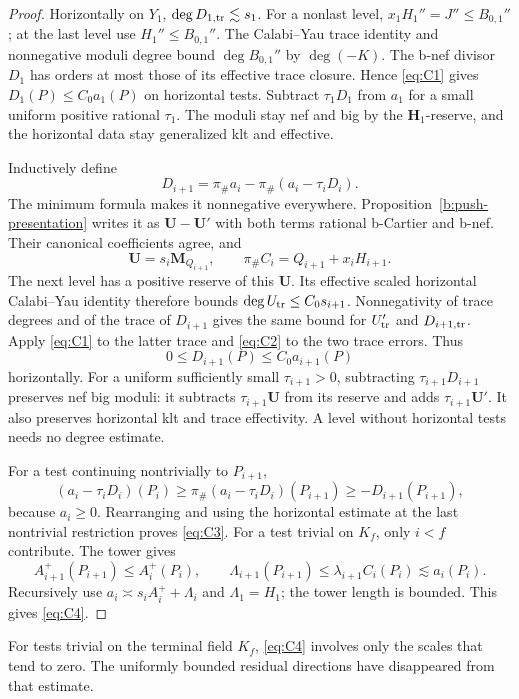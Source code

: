 \begin{proof}
Horizontally on \(Y_1\), \(\deg D_{1,\rm tr}\lesssim s_1\).
For a nonlast level, \(x_1H_1''=J''\le B_{0,1}''\);
at the last level use \(H_1''\le B_{0,1}''\).
The Calabi--Yau trace identity and nonnegative moduli degree bound
\(\deg B_{0,1}''\) by \(\deg(-K)\).
The b-nef divisor \(D_1\) has orders at most those of its effective
trace closure. Hence \eqref{eq:C1} gives
\(D_1(P)\le C_0a_1(P)\) on horizontal tests.
Subtract \(\tau_1D_1\) from \(a_1\) for a small uniform positive
rational \(\tau_1\). The moduli stay nef and big by the
\(\mathbf H_1\)-reserve, and the horizontal data stay generalized
klt and effective.

Inductively define
\[
 D_{i+1}=\pi_\#a_i-\pi_\#(a_i-\tau_iD_i).
\]
The minimum formula makes it nonnegative everywhere.
Proposition~\ref{b:push-presentation} writes it as
\(\mathbf U-\mathbf U'\) with both terms rational b-Cartier
and b-nef. Their canonical coefficients agree, and
\[
 \mathbf U=s_i\mathbf M_{Q_{i+1}},
 \qquad
 \pi_\#C_i=Q_{i+1}+x_iH_{i+1}.
\]
The next level has a positive reserve of this \(\mathbf U\).
Its effective scaled horizontal Calabi--Yau identity therefore
bounds \(\deg U_{\rm tr}\le C_0s_{i+1}\).
Nonnegativity of trace degrees and of the trace of \(D_{i+1}\)
gives the same bound for \(U'_{\rm tr}\) and \(D_{i+1,\rm tr}\).
Apply \eqref{eq:C1} to the latter trace and \eqref{eq:C2} to
the two trace errors. Thus
\[
                   0\le D_{i+1}(P)\le C_0a_{i+1}(P)
\]
horizontally. For a uniform sufficiently small \(\tau_{i+1}>0\),
subtracting \(\tau_{i+1}D_{i+1}\) preserves nef big moduli:
it subtracts \(\tau_{i+1}\mathbf U\) from its reserve and adds
\(\tau_{i+1}\mathbf U'\). It also preserves horizontal klt
and trace effectivity. A level without horizontal tests needs
no degree estimate.

For a test continuing nontrivially to \(P_{i+1}\),
\[
 (a_i-\tau_iD_i)(P_i)
 \ge \pi_\#(a_i-\tau_iD_i)(P_{i+1})
 \ge -D_{i+1}(P_{i+1}),
\]
because \(a_i\ge0\). Rearranging and using the horizontal estimate
at the last nontrivial restriction proves \eqref{eq:C3}.
For a test trivial on \(K_f\), only \(i<f\) contribute.
The tower gives
\[
 A_{i+1}^+(P_{i+1})\le A_i^+(P_i),\qquad
 \Lambda_{i+1}(P_{i+1})
 \le\lambda_{i+1}C_i(P_i)\lesssim a_i(P_i).
\]
Recursively use \(a_i\asymp s_iA_i^++\Lambda_i\) and
\(\Lambda_1=H_1\); the tower length is bounded.
This gives \eqref{eq:C4}.
\end{proof}

For tests trivial on the terminal field $K_f$, \eqref{eq:C4} involves
only the scales that tend to zero. The uniformly bounded residual
directions have disappeared from that estimate.


